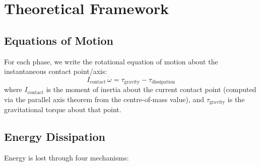 \documentclass[11pt,a4paper]{article}
\newcommand{\contact}{\mathrm{contact}}
\newcommand{\grav}{\mathrm{gravity}}
\newcommand{\diss}{\mathrm{dissipation}}
\begin{document}
\section{Theoretical Framework}

\subsection{Equations of Motion}

For each phase, we write the rotational equation of motion about the instantaneous
contact point/axis:
\begin{equation}
  I_{\contact}\,\dot{\omega}
    = \tau_{\grav} - \tau_{\diss}
\end{equation}
where $I_{\contact}$ is the moment of inertia about the current contact point (computed
via the parallel axis theorem from the centre-of-mass value), and $\tau_{\grav}$ is the
gravitational torque about that point.

\subsection{Energy Dissipation}

Energy is lost through four mechanisms:
\end{document}
